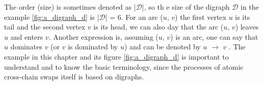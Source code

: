 The order (size) is sometimes denoted as |$\mathcal{D}$|, so th e size of the digraph $\mathcal{D}$ in the example \ref{fig:a_digraph_d} is |$\mathcal{D}$| = 6. For an arc ($u$, $v$) the first vertex $u$ is its tail and the second vertex $v$ is its head, we can also day that the arc ($u$, $v$) leaves $u$ and enters $v$. Another expression is, assuming ($u$, $v$) is an arc, one can say that $u$ dominates $v$ (or $v$ is dominated by $u$) and can be denoted by $u$ $\rightarrow$ $v$ \cite{bang2007theory}. The example in this chapter and its figure \ref{fig:a_digraph_d} is important to understand and to know the basic terminology, since the processes of atomic cross-chain swaps itself is based on digraphs.






%

\clearpage

